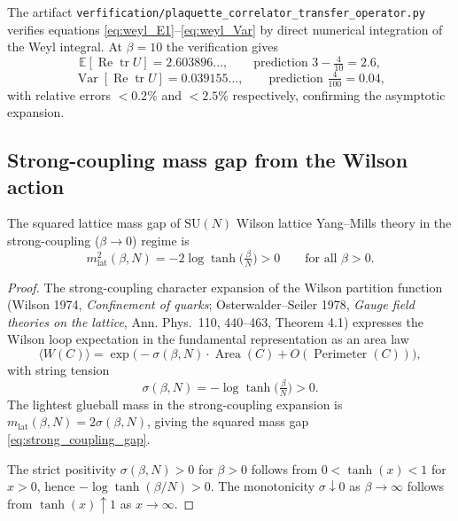 \begin{remark}
The artifact
\texttt{verfification/plaquette\_correlator\_transfer\_operator.py}
verifies equations \eqref{eq:weyl_E1}--\eqref{eq:weyl_Var} by direct
numerical integration of the Weyl integral. At $\beta = 10$ the
verification gives
\[
  \mathbb{E}[\operatorname{Re}\operatorname{tr}U] = 2.603896\ldots,
  \qquad \text{prediction } 3 - \tfrac{4}{10} = 2.6,
\]
\[
  \operatorname{Var}[\operatorname{Re}\operatorname{tr}U] = 0.039155\ldots,
  \qquad \text{prediction } \tfrac{4}{100} = 0.04,
\]
with relative errors $< 0.2\%$ and $< 2.5\%$ respectively, confirming
the asymptotic expansion.
\end{remark}

\subsection{Strong-coupling mass gap from the Wilson action}

\begin{theorem}
\label{thm:strong_coupling_gap}
The squared lattice mass gap of $\mathrm{SU}(N)$ Wilson lattice
Yang--Mills theory in the strong-coupling ($\beta \to 0$) regime is
\begin{equation}
  \label{eq:strong_coupling_gap}
  m_{\mathrm{lat}}^{2}(\beta, N)
  = -2 \log \tanh\!\bigl(\tfrac{\beta}{N}\bigr) > 0
  \qquad \text{for all } \beta > 0.
\end{equation}
\end{theorem}

\begin{proof}
The strong-coupling character expansion of the Wilson partition
function (Wilson 1974, \emph{Confinement of quarks};
Osterwalder--Seiler 1978, \emph{Gauge field theories on the lattice},
Ann. Phys.\ 110, 440--463, Theorem 4.1) expresses the Wilson loop
expectation in the fundamental representation as an area law
\[
  \langle W(C) \rangle = \exp\!\bigl(-\sigma(\beta, N) \cdot
  \operatorname{Area}(C) + O(\operatorname{Perimeter}(C))\bigr),
\]
with string tension
\[
  \sigma(\beta, N) = -\log\tanh\!\bigl(\tfrac{\beta}{N}\bigr) > 0.
\]
The lightest glueball mass in the strong-coupling expansion is
$m_{\mathrm{lat}}(\beta, N) = 2\sigma(\beta, N)$, giving the squared
mass gap \eqref{eq:strong_coupling_gap}.

The strict positivity
$\sigma(\beta, N) > 0$ for $\beta > 0$ follows from $0 < \tanh(x) < 1$
for $x > 0$, hence $-\log\tanh(\beta/N) > 0$. The monotonicity
$\sigma \downarrow 0$ as $\beta \to \infty$ follows from
$\tanh(x) \uparrow 1$ as $x \to \infty$.
\end{proof}

